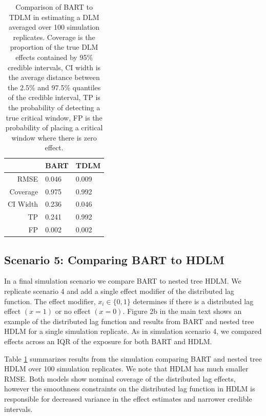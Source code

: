 \documentclass[12pt]{article}
\begin{document}
\begin{table}[!ht]
    \caption{Comparison of BART to TDLM in estimating a DLM averaged over 100 simulation replicates. Coverage is the proportion of the true DLM effects contained by 95\% credible intervals, CI width is the average distance between the 2.5\% and 97.5\% quantiles of the credible interval, TP is the probability of detecting a true critical window, FP is the probability of placing a critical window where there is zero effect.}
    \label{tab:hdlm_v_bart}
    \centering
    \begin{tabular}{rll}
    \toprule[2pt]
            & BART & TDLM\\
            \midrule
         RMSE & 0.046 & 0.009\\
         Coverage & 0.975 & 0.992\\
         CI Width & 0.236 & 0.046\\
         TP & 0.241 & 0.992\\
         FP & 0.002 & 0.002\\
         \bottomrule[2pt]
    \end{tabular}
\end{table}






\subsection{Scenario 5: Comparing BART to HDLM}
In a final simulation scenario we compare BART to nested tree HDLM. We replicate scenario 4 and add a single effect modifier of the distributed lag function. The effect modifier, $x_i\in\{0,1\}$ determines if there is a distributed lag effect $(x=1)$ or no effect $(x=0)$. Figure 2b in the main text shows an example of the distributed lag function and results from BART and nested tree HDLM for a single simulation replicate. As in simulation scenario 4, we compared effects across an IQR of the exposure for both BART and HDLM.

Table \ref{tab:hdlm_v_bart} summarizes results from the simulation comparing BART and nested tree HDLM over 100 simulation replicates. We note that HDLM has much smaller RMSE. Both models show nominal coverage of the distributed lag effects, however the smoothness constraints on the distributed lag function in HDLM is responsible for decreased variance in the effect estimates and narrower credible intervals.
\end{document}
